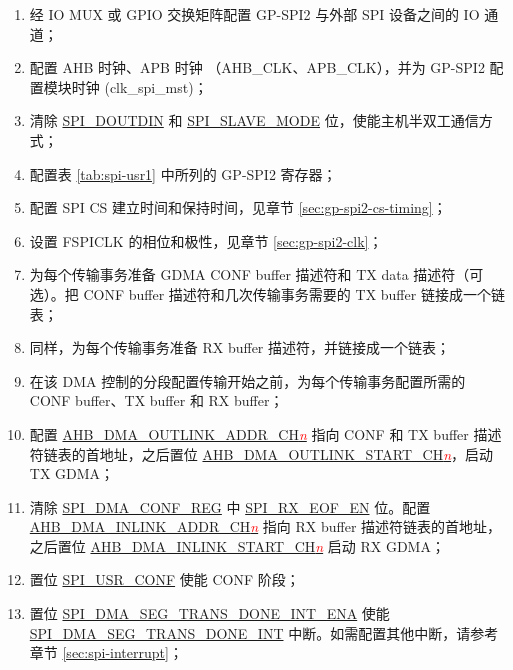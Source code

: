 \documentclass[main\_\_CN.tex]{subfiles}
\begin{document}
 \begin{enumerate}
    \item 经 IO MUX 或 GPIO 交换矩阵配置 GP-SPI2 与外部 SPI 设备之间的 IO 通道； 
    \item 配置 AHB 时钟、APB 时钟 （AHB\_CLK、APB\_CLK），并为 GP-SPI2 配置模块时钟 (clk\_spi\_mst)；

    \item 清除 \hyperref[fielddesc:SPIDOUTDIN]{SPI\_DOUTDIN} 和 \hyperref[fielddesc:SPISLAVEMODE]{SPI\_SLAVE\_MODE} 位，使能主机半双工通信方式；
    
    \item 配置表 \ref{tab:spi-usr1} 中所列的 GP-SPI2 寄存器；
    
    \item 配置 SPI CS 建立时间和保持时间，见章节  \ref{sec:gp-spi2-cs-timing}；
    
    \item 设置 FSPICLK 的相位和极性，见章节  \ref{sec:gp-spi2-clk}； 
 
   \item 为每个传输事务准备 GDMA CONF buffer 描述符和 TX data 描述符（可选）。把 CONF buffer 描述符和几次传输事务需要的 TX buffer 链接成一个链表；
   
   \item 同样，为每个传输事务准备 RX buffer 描述符，并链接成一个链表；
   \item 在该 DMA 控制的分段配置传输开始之前，为每个传输事务配置所需的 CONF buffer、TX buffer 和 RX buffer；
   
   \item 配置 \hyperref[fielddesc:AHBDMAOUTLINKADDRCHN]{AHB\_DMA\_OUTLINK\_ADDR\_CH\textcolor{red}{\it{n}}} 指向 CONF 和 TX buffer 描述符链表的首地址，之后置位 \hyperref[fielddesc:AHBDMAOUTLINKSTARTCHN]{AHB\_DMA\_OUTLINK\_START\_CH\textcolor{red}{\it{n}}}，启动 TX GDMA；

   \item 清除 \hyperref[regdesc:SPIDMACONFREG]{SPI\_DMA\_CONF\_REG} 中 \hyperref[fielddesc:SPIRXEOFEN]{SPI\_RX\_EOF\_EN} 位。配置 \hyperref[fielddesc:AHBDMAINLINKADDRCHN]{AHB\_DMA\_INLINK\_ADDR\_CH\textcolor{red}{\it{n}}}  指向 RX buffer 描述符链表的首地址，之后置位 \hyperref[fielddesc:AHBDMAINLINKSTARTCHN]{AHB\_DMA\_INLINK\_START\_CH\textcolor{red}{\it{n}}}  启动 RX GDMA； 
      
   \item 置位 \hyperref[fielddesc:SPIUSRCONF]{SPI\_USR\_CONF} 使能 CONF 阶段；
   \item 置位 \hyperref[fielddesc:SPIDMASEGTRANSDONEINTENA]{SPI\_DMA\_SEG\_TRANS\_DONE\_INT\_ENA} 使能 \hyperref[int:SPIDMASEGTRANSDONEINT]{SPI\_DMA\_SEG\_TRANS\_DONE\_INT} 中断。如需配置其他中断，请参考章节  \ref{sec:spi-interrupt}； 


\end{enumerate}
\end{document}
